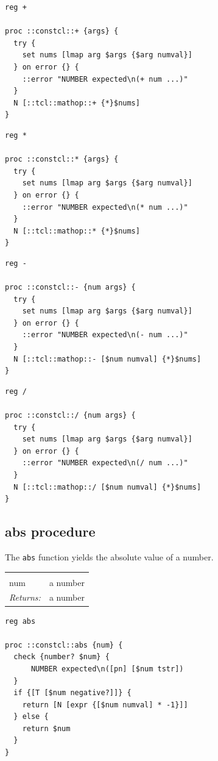 \documentclass[twoside]{report}
\begin{document}
\begin{lstlisting}
reg +

proc ::constcl::+ {args} {
  try {
    set nums [lmap arg $args {$arg numval}]
  } on error {} {
    ::error "NUMBER expected\n(+ num ...)"
  }
  N [::tcl::mathop::+ {*}$nums]
}
\end{lstlisting}

\begin{lstlisting}
reg *

proc ::constcl::* {args} {
  try {
    set nums [lmap arg $args {$arg numval}]
  } on error {} {
    ::error "NUMBER expected\n(* num ...)"
  }
  N [::tcl::mathop::* {*}$nums]
}
\end{lstlisting}

\begin{lstlisting}
reg -

proc ::constcl::- {num args} {
  try {
    set nums [lmap arg $args {$arg numval}]
  } on error {} {
    ::error "NUMBER expected\n(- num ...)"
  }
  N [::tcl::mathop::- [$num numval] {*}$nums]
}
\end{lstlisting}

\begin{lstlisting}
reg /

proc ::constcl::/ {num args} {
  try {
    set nums [lmap arg $args {$arg numval}]
  } on error {} {
    ::error "NUMBER expected\n(/ num ...)"
  }
  N [::tcl::mathop::/ [$num numval] {*}$nums]
}
\end{lstlisting}

\subsection{abs procedure}
\label{abs-procedure}

The \texttt{abs} function yields the absolute value of a number.

\noindent\begin{tabular}{ |p{1.9cm} p{8cm}| }
\hline
\rowcolor[HTML]{CCCCCC} \multicolumn{2}{|l|}{\bf abs (public)} \\
num & a number \\
\textit{Returns:} & a number \\
\hline
\end{tabular}

\begin{lstlisting}
reg abs

proc ::constcl::abs {num} {
  check {number? $num} {
      NUMBER expected\n([pn] [$num tstr])
  }
  if {[T [$num negative?]]} {
    return [N [expr {[$num numval] * -1}]]
  } else {
    return $num
  }
}
\end{lstlisting}
\end{document}
